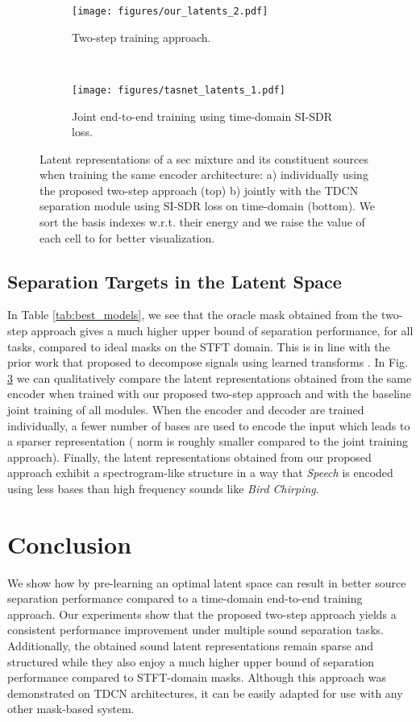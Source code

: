 \documentclass{article}
\begin{document}
\begin{figure}[!htb]
    \centering
  \begin{subfigure}[h]{\linewidth}
      \texttt{[image: figures/our\_latents\_2.pdf]}
      \caption{Two-step training approach.}
      \label{fig:our_latents}
  \end{subfigure} \\
  \begin{subfigure}[h]{\linewidth}
      \texttt{[image: figures/tasnet\_latents\_1.pdf]}
      \caption{Joint end-to-end training using time-domain SI-SDR loss.}
      \label{fig:tasnet_latents}
  \end{subfigure} 
    \caption{Latent representations of a sec mixture and its constituent sources when training the same encoder architecture: a) individually using the proposed two-step approach (top) b) jointly with the TDCN separation module using SI-SDR loss on time-domain (bottom). We sort the basis indexes w.r.t. their energy and we raise the value of each cell to  for better visualization.}
    \label{fig:latentrepresentations}
\end{figure} 
\subsection{Separation Targets in the Latent Space}
In Table \ref{tab:best_models}, we see that the oracle mask obtained from the two-step approach gives a much higher upper bound of separation performance, for all tasks, compared to ideal masks on the STFT domain. This is in line with the prior work that proposed to decompose signals using learned transforms \cite{luo2019convTasNet, venkataramani2018end}. In Fig. \ref{fig:latentrepresentations} we can qualitatively compare the latent representations obtained from the same encoder when trained with our proposed two-step approach and with the baseline joint training of all modules. When the encoder and decoder are trained individually, a fewer number of bases are used to encode the input which leads to a sparser representation ( norm is roughly  smaller compared to the joint training approach). Finally, the latent representations obtained from our proposed approach exhibit a spectrogram-like structure in a way that \textit{Speech} is encoded using less bases than high frequency sounds like \textit{Bird Chirping}. 
\section{Conclusion}
We show how by pre-learning an optimal latent space can result in better source separation performance compared to a time-domain end-to-end training approach. Our experiments show that the proposed two-step approach yields a consistent performance improvement under multiple sound separation tasks. Additionally, the obtained sound latent representations remain sparse and structured while they also enjoy a much higher upper bound of separation performance compared to STFT-domain masks. Although this approach was demonstrated on TDCN architectures, it can be easily adapted for use with any other mask-based system. \vfill\pagebreak \balance


\end{document}

